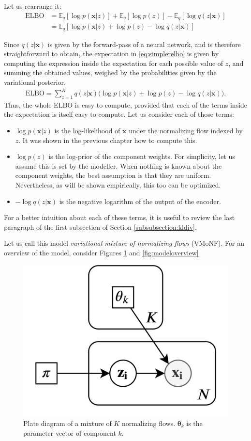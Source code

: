 Let us rearrange it:
\begin{align}
    \text{ELBO} &= \mathbb{E}_q [\log p(\bm{x}|z)] + \mathbb{E}_q [\log p(z)] - \mathbb{E}_q [\log q(z|\bm{x})]
        \label{eq:threepartelbo} \\
    &= \mathbb{E}_q [\log p(\bm{x}|z) + \log p(z) - \log q(z|\bm{x})] \label{eq:simplerelbo}
\end{align}

Since $q(z|\bm{x})$ is given by the forward-pass of a neural network, and is therefore
straightforward to obtain, the expectation in \ref{eq:simplerelbo} is given by
computing the expression inside the expectation for each possible value of $z$,
and summing the obtained values, weighed by the probabilities given by the variational posterior.
\begin{align}
    \text{ELBO} = \sum_{z=1}^K q(z|\bm{x})\big(\log p(\bm{x}|z) + \log p(z) - \log q(z|\bm{x})\big).
\end{align}
Thus, the whole ELBO is easy to compute, provided that each of the terms inside
the expectation is itself easy to compute. Let us consider each of those terms:
\begin{itemize}
    \item $\log p(\bm{x}|z)$ is the log-likelihood of $\bm{x}$ under the normalizing
        flow indexed by $z$. It was shown in the previous chapter how to compute
        this.
    \item $\log p(z)$ is the log-prior of the component weights. For simplicity,
        let us assume this is set by the modeller. When nothing is known about
        the component weights, the best assumption is that they are uniform.
        Nevertheless, as will be shown empirically, this too can be optimized.
    \item $- \log q(z|\bm{x})$ is the negative logarithm of the output of the encoder.
\end{itemize}

For a better intuition about each of these terms, it is useful to review the last
paragraph of the first subsection of Section \ref{subsubsection:kldiv}.

Let us call this model \emph{variational mixture of normalizing flows} (VMoNF). For an overview of
the model, consider Figures \ref{fig:plate} and \ref{fig:modeloverview}

\begin{figure}[!htb]
  \centering
  \includegraphics[width=0.5\linewidth]{figures/plate_diagram.png}
  \caption{Plate diagram of a mixture of $K$ normalizing flows. $\bm\theta_k$ is the
    parameter vector of component $k$.}
  \label{fig:plate}
\end{figure}


